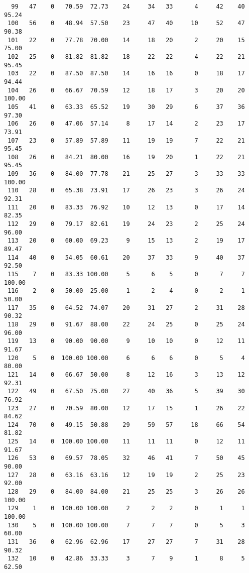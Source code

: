 \begin{verbatim}
  99   47    0   70.59  72.73    24     34   33      4     42    40    95.24
 100   56    0   48.94  57.50    23     47   40     10     52    47    90.38
 101   22    0   77.78  70.00    14     18   20      2     20    15    75.00
 102   25    0   81.82  81.82    18     22   22      4     22    21    95.45
 103   22    0   87.50  87.50    14     16   16      0     18    17    94.44
 104   26    0   66.67  70.59    12     18   17      3     20    20   100.00
 105   41    0   63.33  65.52    19     30   29      6     37    36    97.30
 106   26    0   47.06  57.14     8     17   14      2     23    17    73.91
 107   23    0   57.89  57.89    11     19   19      7     22    21    95.45
 108   26    0   84.21  80.00    16     19   20      1     22    21    95.45
 109   36    0   84.00  77.78    21     25   27      3     33    33   100.00
 110   28    0   65.38  73.91    17     26   23      3     26    24    92.31
 111   20    0   83.33  76.92    10     12   13      0     17    14    82.35
 112   29    0   79.17  82.61    19     24   23      2     25    24    96.00
 113   20    0   60.00  69.23     9     15   13      2     19    17    89.47
 114   40    0   54.05  60.61    20     37   33      9     40    37    92.50
 115    7    0   83.33 100.00     5      6    5      0      7     7   100.00
 116    2    0   50.00  25.00     1      2    4      0      2     1    50.00
 117   35    0   64.52  74.07    20     31   27      2     31    28    90.32
 118   29    0   91.67  88.00    22     24   25      0     25    24    96.00
 119   13    0   90.00  90.00     9     10   10      0     12    11    91.67
 120    5    0  100.00 100.00     6      6    6      0      5     4    80.00
 121   14    0   66.67  50.00     8     12   16      3     13    12    92.31
 122   49    0   67.50  75.00    27     40   36      5     39    30    76.92
 123   27    0   70.59  80.00    12     17   15      1     26    22    84.62
 124   70    0   49.15  50.88    29     59   57     18     66    54    81.82
 125   14    0  100.00 100.00    11     11   11      0     12    11    91.67
 126   53    0   69.57  78.05    32     46   41      7     50    45    90.00
 127   28    0   63.16  63.16    12     19   19      2     25    23    92.00
 128   29    0   84.00  84.00    21     25   25      3     26    26   100.00
 129    1    0  100.00 100.00     2      2    2      0      1     1   100.00
 130    5    0  100.00 100.00     7      7    7      0      5     3    60.00
 131   36    0   62.96  62.96    17     27   27      7     31    28    90.32
 132   10    0   42.86  33.33     3      7    9      1      8     5    62.50

\end{verbatim}
